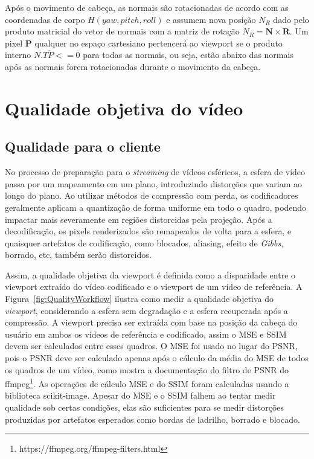 Após o movimento de cabeça, as normais são rotacionadas de acordo com as coordenadas de corpo $H(yaw, pitch, roll)$ e assumem nova posição $ N_R $ dado pelo produto matricial do vetor de normais com a matriz de rotação $ N_R = \textbf{N} \times \textbf{R}$. Um pixel $ \textbf{P}$ qualquer no espaço cartesiano pertencerá ao viewport se o produto interno $ N.T \dot P <=0 $ para todas as normais, ou seja, estão abaixo das normais após as normais forem rotacionadas durante o movimento da cabeça.

\section{Qualidade objetiva do vídeo}

\subsection{Qualidade para o cliente}
No processo de preparação para o \textit{streaming} de vídeos esféricos, a esfera de vídeo passa por um mapeamento em um plano, introduzindo distorções que variam ao longo do plano. Ao utilizar métodos de compressão com perda, os codificadores geralmente aplicam a quantização de forma uniforme em todo o quadro, podendo impactar mais severamente em regiões distorcidas pela projeção. Após a decodificação, os pixels renderizados são remapeados de volta para a esfera, e quaisquer artefatos de codificação, como blocados, aliasing, efeito de \textit{Gibbs}, borrado, etc, também serão distorcidos.

Assim, a qualidade objetiva da viewport é definida como a disparidade entre o viewport extraído do vídeo codificado e o viewport de um vídeo de referência.   A Figura~\ref{fig:QualityWorkflow} ilustra como medir a qualidade objetiva do \textit{viewport}, considerando a esfera sem degradação e a esfera recuperada após a compressão. A viewport precisa ser extraída com base na posição da cabeça do usuário em ambos os vídeos de referência e codificado, assim o MSE e SSIM devem ser calculados entre esses quadros. O MSE foi usado no lugar do PSNR, pois o PSNR deve ser calculado apenas após o cálculo da média do MSE de todos os quadros de um vídeo, como mostra a documentação do filtro de PSNR do ffmpeg\footnote{https://ffmpeg.org/ffmpeg-filters.html}. As operações de cálculo MSE e do SSIM foram calculadas usando a biblioteca scikit-image. Apesar do MSE e o SSIM falhem ao tentar medir qualidade sob certas condições, elas são suficientes para se medir distorções produzidas por artefatos esperados como bordas de ladrilho, borrado e blocado.~\cite{Bovik2009} 

